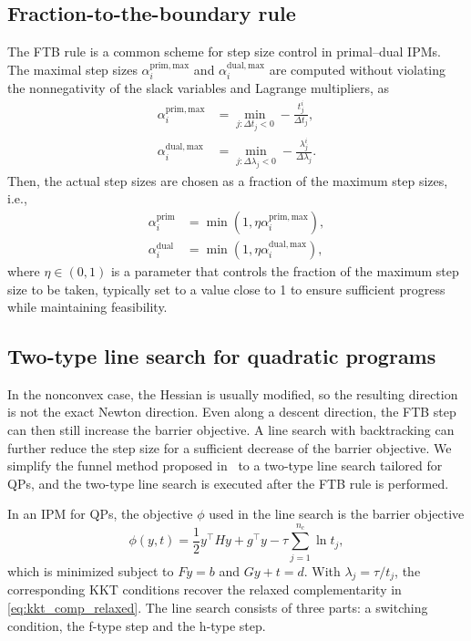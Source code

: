 \documentclass[class=scrbook, crop=false]{standalone}
\begin{document}
\subsection{Fraction-to-the-boundary rule}
\label{subsec:ftb}
The \gls{FTB} rule is a common scheme for step size control in primal--dual \glspl{IPM}.
The maximal step sizes $\alpha_i^{\mathrm{prim},\mathrm{max}}$ and $\alpha_i^{\mathrm{dual},\mathrm{max}}$ are computed
without violating the nonnegativity of the slack variables and Lagrange multipliers, as
\begin{align}
    \alpha_i^{\mathrm{prim},\mathrm{max}} &= \min_{j:\Delta t_j<0} -\frac{t_j^i}{\Delta t_j}, \label{eq:ftb_max_prim} \\
    \alpha_i^{\mathrm{dual},\mathrm{max}} &= \min_{j:\Delta \lambda_j<0} -\frac{\lambda_j^i}{\Delta \lambda_j}. \label{eq:ftb_max_dual}
\end{align}
Then, the actual step sizes are chosen as a fraction of the maximum step sizes, i.e.,
\begin{align}
    \alpha_i^{\mathrm{prim}} &= \min(1, \eta \alpha_i^{\mathrm{prim},\mathrm{max}}),\\
    \alpha_i^{\mathrm{dual}} &= \min(1, \eta \alpha_i^{\mathrm{dual},\mathrm{max}}),
\end{align}
where $\eta \in (0, 1)$ is a parameter that controls the fraction of the maximum step size to be taken,
typically set to a value close to 1 to ensure sufficient progress while maintaining feasibility.

\subsection{Two-type line search for quadratic programs}
\label{subsec:two_phase_search}
In the nonconvex case, the Hessian is usually modified, 
so the resulting direction is not the exact Newton direction.
Even along a descent direction, the \gls{FTB} step can then still increase the barrier objective.
A line search with backtracking can further reduce the step size for a sufficient decrease of the barrier objective.
We simplify the funnel method proposed in~\cite{kiesslingUnifiedFunnelRestoration2025} 
to a two-type line search tailored for \glspl{QP}, and the two-type line search is executed 
after the \gls{FTB} rule is performed. 

In an \gls{IPM} for \glspl{QP}, the objective $\phi$ used in the line search is the barrier objective
\begin{equation}
    \phi(y, t) = \frac{1}{2} y^\top H y + g^\top y - \tau \sum_{j=1}^{n_c} \ln t_j,
    \label{eq:barrier_objective}
\end{equation}
which is minimized subject to $Fy = b$ and $Gy + t = d$.
With $\lambda_j = \tau / t_j$, the corresponding \gls{KKT} conditions recover the relaxed complementarity in \eqref{eq:kkt_comp_relaxed}.
The line search consists of three parts: a switching condition, the f-type step and the h-type step.
\end{document}
